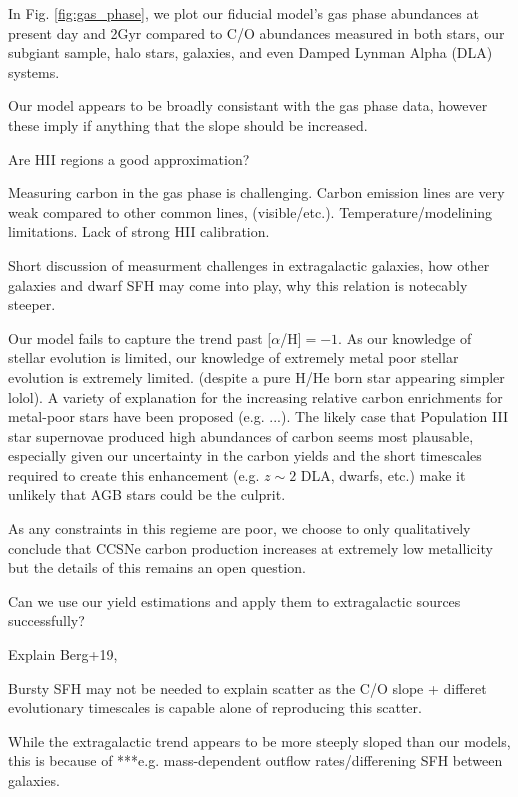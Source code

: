 \documentclass[fleqn,usenatbib]{mnras}
\begin{document}
In Fig. \ref{fig:gas_phase}, we plot our fiducial model's gas phase abundances
at present day and 2Gyr compared to C/O
abundances measured in both stars, our subgiant sample, halo stars, galaxies,
and even Damped Lynman Alpha (DLA) systems. 

Our model appears to be broadly consistant with the gas phase data, however these imply if anything that the slope should be increased. 

Are HII regions a good approximation?

Measuring carbon in the gas phase is challenging. Carbon emission lines are
very weak compared to other common lines, (visible/etc.).
Temperature/modelining limitations. Lack of strong HII calibration. 

Short discussion of measurment challenges in extragalactic galaxies, how other galaxies and dwarf SFH may come into play, why this relation is notecably steeper.

Our model fails to capture the trend past [$\alpha$/H]$=-1$. As our knowledge
of stellar evolution is limited, our knowledge of extremely metal poor stellar
evolution is extremely limited. (despite a pure H/He born star appearing
simpler lolol). A variety of explanation for the increasing relative carbon
enrichments for metal-poor stars have been proposed (e.g. ...). The likely case
that Population III star supernovae produced high abundances of carbon seems
most plausable, especially given our uncertainty in the carbon yields and the
short timescales required to create this enhancement (e.g. $z\sim 2$ DLA,
dwarfs, etc.) make it unlikely that AGB stars could be the culprit. 

As any constraints in this regieme are poor, we choose to only qualitatively
conclude that CCSNe carbon production increases at extremely low metallicity
but the details of this remains an open question.


Can we use our yield estimations and apply them to extragalactic sources successfully? 

Explain Berg+19,

Bursty SFH may not be needed to explain scatter as the C/O slope + differet evolutionary timescales is capable alone of reproducing this scatter.

While the extragalactic trend appears to be more steeply sloped than our models, this is because of ***e.g. mass-dependent outflow rates/differening SFH between galaxies. 
\end{document}
